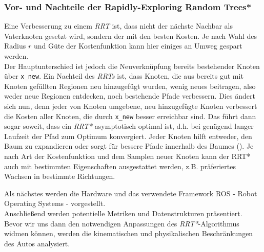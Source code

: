 \subsubsection{Vor- und Nachteile der Rapidly-Exploring Random Trees*}
\label{sec:rrt*}
Eine Verbesserung zu einem \textit{RRT} ist, dass nicht der nächste Nachbar als Vaterknoten gesetzt wird, sondern der mit den besten Kosten. Je nach Wahl des Radius $r$ und Güte der Kostenfunktion kann hier einiges an \glqq Umweg\grqq{} gespart werden. \\
Der Hauptunterschied ist jedoch die Neuverknüpfung bereits bestehender Knoten über \verb|x_new|. Ein Nachteil des \textit{RRTs} ist, dass Knoten, die aus bereits gut mit Knoten gefüllten Regionen neu hinzugefügt wurden, wenig neues beitragen, also weder neue Regionen entdecken, noch bestehende Pfade verbessern. Dies ändert sich nun, denn jeder von Knoten umgebene, neu hinzugefügte Knoten verbessert die Kosten aller Knoten, die durch \verb|x_new| besser erreichbar sind. Das führt dann sogar soweit, dass ein \textit{RRT*} asymptotisch optimal ist, d.h. bei genügend langer Laufzeit der Pfad zum Optimum konvergiert. Jeder Knoten hilft entweder, den Baum zu expandieren oder sorgt für bessere Pfade innerhalb des Baumes (\citep[vgl. Kapitel 5 in][]{KaFra10}). Je nach Art der Kostenfunktion und dem Samplen neuer Knoten kann der RRT* auch mit bestimmten Eigenschaften ausgestattet werden, z.B. präferiertes Wachsen in bestimmte Richtungen.

Als nächstes werden die Hardware und das verwendete Framework ROS - Robot Operating Systems - vorgestellt. \\
Anschließend werden potentielle Metriken und Datenstrukturen präsentiert.
Bevor wir uns dann den notwendigen Anpassungen des \textit{RRT*}-Algorithmus widmen können, werden die kinematischen und physikalischen Beschränkungen des Autos analysiert.
